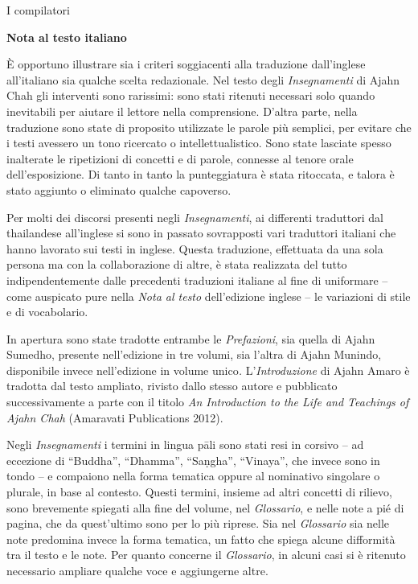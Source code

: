 I compilatori

\textbf{Nota al testo italiano}

È opportuno illustrare sia i criteri soggiacenti alla traduzione
dall'inglese all'italiano sia qualche scelta redazionale. Nel testo
degli \emph{Insegnamenti} di Ajahn Chah gli interventi sono rarissimi:
sono stati ritenuti necessari solo quando inevitabili per aiutare il
lettore nella comprensione. D'altra parte, nella traduzione sono state
di proposito utilizzate le parole più semplici, per evitare che i testi
avessero un tono ricercato o intellettualistico. Sono state lasciate
spesso inalterate le ripetizioni di concetti e di parole, connesse al
tenore orale dell'esposizione. Di tanto in tanto la punteggiatura è
stata ritoccata, e talora è stato aggiunto o eliminato qualche
capoverso.

Per molti dei discorsi presenti negli \emph{Insegnamenti}, ai differenti
traduttori dal thailandese all'inglese si sono in passato sovrapposti
vari traduttori italiani che hanno lavorato sui testi in inglese. Questa
traduzione, effettuata da una sola persona ma con la collaborazione di
altre, è stata realizzata del tutto indipendentemente dalle precedenti
traduzioni italiane al fine di uniformare -- come auspicato pure nella
\emph{Nota al testo} dell'edizione inglese -- le variazioni di stile e
di vocabolario.

In apertura sono state tradotte entrambe le \emph{Prefazioni}, sia
quella di Ajahn Sumedho, presente nell'edizione in tre volumi, sia
l'altra di Ajahn Munindo, disponibile invece nell'edizione in volume
unico\emph{.} L'\emph{Introduzione} di Ajahn Amaro è tradotta dal testo
ampliato, rivisto dallo stesso autore e pubblicato successivamente a
parte con il titolo \emph{An Introduction to the Life and Teachings of
Ajahn Chah} (Amaravati Publications 2012).

Negli \emph{Insegnamenti} i termini in lingua pāli sono stati resi in
corsivo -- ad eccezione di ``Buddha'', ``Dhamma'', ``Saṇgha'',
``Vinaya'', che invece sono in tondo -- e compaiono nella forma tematica
oppure al nominativo singolare o plurale, in base al contesto. Questi
termini, insieme ad altri concetti di rilievo, sono brevemente spiegati
alla fine del volume, nel \emph{Glossario}, e nelle note a pié di
pagina, che da quest'ultimo sono per lo più riprese. Sia nel
\emph{Glossario} sia nelle note predomina invece la forma tematica, un
fatto che spiega alcune difformità tra il testo e le note. Per quanto
concerne il \emph{Glossario}, in alcuni casi si è ritenuto necessario
ampliare qualche voce e aggiungerne altre.

